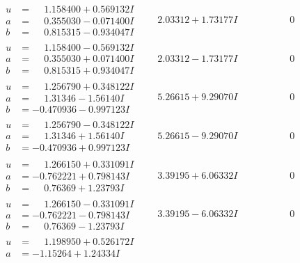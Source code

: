 \documentclass[1p]{elsarticle_modified}
\theoremstyle{definition}
\begin{document}
$$\begin{array}{c|c|c}
\begin{aligned}
u &= \phantom{-}1.158400 + 0.569132 I \\
a &= \phantom{-}0.355030 - 0.071400 I \\
b &= \phantom{-}0.815315 - 0.934047 I\end{aligned}
 & \phantom{-}2.03312 + 1.73177 I & \phantom{-0.000000 } 0 \\ \hline\begin{aligned}
u &= \phantom{-}1.158400 - 0.569132 I \\
a &= \phantom{-}0.355030 + 0.071400 I \\
b &= \phantom{-}0.815315 + 0.934047 I\end{aligned}
 & \phantom{-}2.03312 - 1.73177 I & \phantom{-0.000000 } 0 \\ \hline\begin{aligned}
u &= \phantom{-}1.256790 + 0.348122 I \\
a &= \phantom{-}1.31346 - 1.56140 I \\
b &= -0.470936 - 0.997123 I\end{aligned}
 & \phantom{-}5.26615 + 9.29070 I & \phantom{-0.000000 } 0 \\ \hline\begin{aligned}
u &= \phantom{-}1.256790 - 0.348122 I \\
a &= \phantom{-}1.31346 + 1.56140 I \\
b &= -0.470936 + 0.997123 I\end{aligned}
 & \phantom{-}5.26615 - 9.29070 I & \phantom{-0.000000 } 0 \\ \hline\begin{aligned}
u &= \phantom{-}1.266150 + 0.331091 I \\
a &= -0.762221 + 0.798143 I \\
b &= \phantom{-}0.76369 + 1.23793 I\end{aligned}
 & \phantom{-}3.39195 + 6.06332 I & \phantom{-0.000000 } 0 \\ \hline\begin{aligned}
u &= \phantom{-}1.266150 - 0.331091 I \\
a &= -0.762221 - 0.798143 I \\
b &= \phantom{-}0.76369 - 1.23793 I\end{aligned}
 & \phantom{-}3.39195 - 6.06332 I & \phantom{-0.000000 } 0 \\ \hline\begin{aligned}
u &= \phantom{-}1.198950 + 0.526172 I \\
a &= -1.15264 + 1.24334 I \\

\end{aligned}
\end{array}$$
\end{document}
